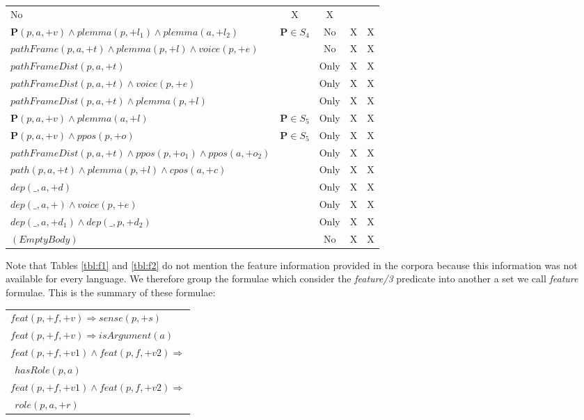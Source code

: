 \begin{table*}[th]
\begin{tabular}{|>{\small}p{10cm}|>{\small}c|>{\small}c|>{\small}c|>{\small}c|}
   No  & X & X \\
   $ \mathbf{P}(p,a,+v) \land plemma(p,+l_1) \land plemma(a,+l_2) $    &   
   $\mathbf{P} \in S_4$ & No  & X & X \\
   $ pathFrame(p,a,+t) \land plemma(p,+l) \land voice(p,+e) $ &      & No      & 
   X & X \\
   $ pathFrameDist(p,a,+t) $      &  & Only   & X & X \\
   $ pathFrameDist(p,a,+t) \land voice(p,+e) $ &  & Only           & X & X 
   \\
   $ pathFrameDist(p,a,+t) \land plemma(p,+l)$ &  & Only           & X & X 
   \\
   $ \mathbf{P}(p,a,+v) \land plemma(a,+l) $ & $\mathbf{P} \in S_5$ & Only         
   & X & X \\
   $ \mathbf{P}(p,a,+v) \land ppos(p,+o) $ & $\mathbf{P} \in S_5$   & Only        
   & X & X \\
   $ pathFrameDist(p,a,+t) \land ppos(p,+o_1) \land ppos(a,+o_2) $ &  & Only           
   & X & X \\
   $ path(p,a,+t) \land plemma(p,+l) \land cpos(a,+c) $ &  & Only          & X & 
   X \\
   $ dep(\_,a,+d)$  & & Only  & X & X \\
   $ dep(\_,a,+) \land voice(p,+e)$    &  & Only & X & X  \\
   $ dep(\_,a,+d_1) \land dep(\_,p,+d_2)$    & & Only & X & X  \\
   $ (Empty Body)                $    &                           & No & X & X \\
\hline
\end{tabular}


\caption{Templates of the local formulae for \emph{hasRole/2} and 
\emph{role/3}. H: head of clause is $hasRole(p,a)$, R: head of clause is 
$role(p,a,+r)$ and $S_1 = \{ppos,plemma\}, S_2=\{frame, unlabelFrame, path\}, S_3= \{frame,pathFrame\},S_4=\{frame,pathFrame,path\}, S_5= \{pathFrameDist, path\} $}
\label{tbl:f2}
\end{table*}

Note that Tables \ref{tbl:f1} and \ref{tbl:f2} do not mention the feature information provided in the corpora because 
this information was not available for every language. We therefore group the 
formulae which consider the \emph{feature/3} predicate into another a set we call 
\emph{feature} formulae. This is the summary of these formulae:
\begin{tabular}{p{7.5cm}}
   $ feat(p,+f,+v) \Rightarrow sense(p,+s)    $\\
   $ feat(p,+f,+v) \Rightarrow isArgument(a)    $\\
   $ feat(p,+f,+v1) \land feat(p,f,+v2) \Rightarrow $\\$\ \ hasRole(p,a)    $\\
   $ feat(p,+f,+v1) \land feat(p,f,+v2) \Rightarrow $\\$\ \ role(p,a,+r)   $\\
\end{tabular}


